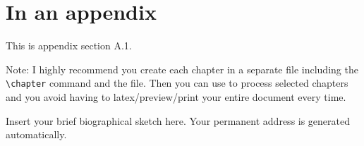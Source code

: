 \documentclass[11pt]{afthesis}
\begin{document}
	\section{In an appendix} 
	
	This is appendix section A.1.
	
	Note: I highly recommend you create each chapter in a separate file
	including the \verb|\chapter| command and \verb|| the file.
	Then you can use \verb|| to process selected chapters and
	you avoid having to latex/preview/print your entire document every
	time.
	
	
	
	
	
	
	\begin{vita}
		Insert your brief biographical sketch here. Your permanent
		address is generated automatically.
	\end{vita}
	
	
\end{document}
